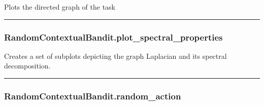 \begin{Shaded}
\begin{Highlighting}[]
\OperatorTok{=}\OperatorTok{=}\OperatorTok{=}\OperatorTok{=}\OperatorTok{=}\OperatorTok{=}\OperatorTok{=}\OperatorTok{=}\NormalTok{)}
\end{Highlighting}
\end{Shaded}

Plots the directed graph of the task

\begin{center}\rule{0.5\linewidth}{\linethickness}\end{center}

\hypertarget{randomcontextualbandit.plot_spectral_properties}{%
\subsubsection{RandomContextualBandit.plot\_spectral\_properties}\label{randomcontextualbandit.plot_spectral_properties}}

\begin{Shaded}
\begin{Highlighting}[]
\OperatorTok{=}\OperatorTok{=}\OperatorTok{=}\NormalTok{)}
\end{Highlighting}
\end{Shaded}

Creates a set of subplots depicting the graph Laplacian and its spectral
decomposition.

\begin{center}\rule{0.5\linewidth}{\linethickness}\end{center}

\hypertarget{randomcontextualbandit.random_action}{%
\subsubsection{RandomContextualBandit.random\_action}\label{randomcontextualbandit.random_action}}

